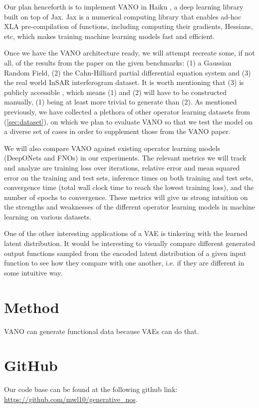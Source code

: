 \documentclass[11pt, fullpage,letterpaper]{article}
\begin{document}
Our plan henceforth is to implement VANO in Haiku \cite{haiku2020github}, a deep learning library built on top of Jax. Jax is a numerical computing library that enables ad-hoc XLA pre-compilation of functions, including computing their gradients, Hessians, etc, which makes training machine learning models fast and efficient.

Once we have the VANO architecture ready, we will attempt recreate some, if not all, of the results from the paper on the given benchmarks: (1) a Gaussian Random Field, (2) the Cahn-Hilliard partial differential equation system and (3) the real world InSAR interferogram dataset. It is worth mentioning that (3) is publicly accessible \cite{rahman2022generative}, which means (1) and (2) will have to be constructed manually, (1) being at least more trivial to generate than (2). As mentioned previously, we have collected a plethora of other operator learning datasets from \cite{Lu_2022} (\ref{sec:dataset}), on which we plan to evaluate VANO so that we test the model on a diverse set of cases in order to supplement those from the VANO paper. 


We will also compare VANO against existing operator learning models (DeepONets and FNOs) in our experiments. The relevant metrics we will track and analyze are training loss over iterations, relative error and mean squared error on the training and test sets, inference times on both training and test sets, convergence time (total wall clock time to reach the lowest training loss), and the number of epochs to convergence. These metrics will give us strong intuition on the strengths and weaknesses of the different operator learning models in machine learning on various datasets.

One of the other interesting applications of a VAE is tinkering with the learned latent distribution. It would be interesting to visually compare different generated output functions sampled from the encoded latent distribution of a given input function to see how they compare with one another, i.e. if they are different in some intuitive way.

\section{Method}
VANO can generate functional data because VAEs can do that.

\section{GitHub}
Our code base can be found at the following github link: \url{https://github.com/mwl10/generative_nos}. 


\end{document}
